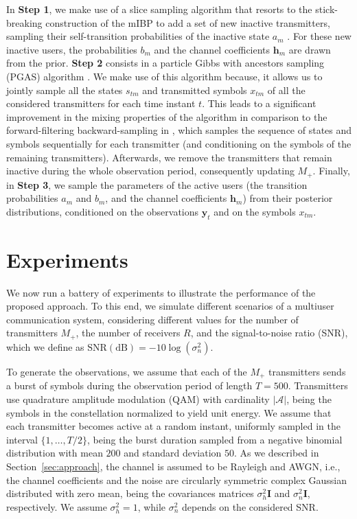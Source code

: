 \documentclass[a4paper]{article}
\def\yt{\mathbf{y}_t}
\def\hm{\mathbf{h}_m}
\def\xtm{x_{tm}}
\def\stm{s_{tm}}
\def\Acal{\mathcal{A}}
\begin{document}
In \textbf{Step 1}, we make use of a slice sampling  algorithm that resorts to the stick-breaking construction of the mIBP to add a set of new inactive transmitters, sampling their self-transition probabilities of the inactive state $a_m$ \cite{StickBreakingIBP}. For these new inactive users, the probabilities $b_m$  and the channel coefficients $\hm$ are drawn from the prior.
%
\textbf{Step 2} consists in a particle Gibbs with ancestors sampling (PGAS) algorithm \cite{lindsten2014particle}. We make use of this algorithm because, it allows us to jointly sample all the states $\stm$ and transmitted symbols $\xtm$ of all the considered transmitters for each time instant $t$. This leads to a significant improvement in the mixing properties of the algorithm in comparison to the forward-filtering backward-sampling in \cite{IFHMM}, which samples the sequence of states and symbols sequentially for each transmitter (and conditioning on the symbols of the remaining transmitters). Afterwards, we remove the transmitters that remain inactive during the whole observation period, consequently updating $M_+$. 
%
Finally, in \textbf{Step 3}, we sample the parameters of the active users (the transition probabilities $a_m$ and $b_m$, and the channel coefficients $\hm$) from their posterior distributions, conditioned on the observations $\yt$ and on the symbols $\xtm$.


\section{Experiments}
\label{sec:experiments}
We now run a battery of experiments to illustrate the performance of the proposed approach. To this end, we simulate different scenarios of a multiuser communication system, considering different values for the number of transmitters $M_+$, the number of receivers $R$, and the signal-to-noise ratio (SNR), which we define as $\mathrm{SNR (dB)} = -10 \log (\sigma^2_n)$. 

To generate the observations, we assume that each of the $M_+$ transmitters sends a burst of symbols during the observation period of length $T=500$. Transmitters use quadrature amplitude modulation (QAM) with cardinality $|\Acal|$, being the symbols in the constellation normalized to yield unit energy. We assume that each transmitter becomes active at a random instant, uniformly sampled in the interval $\{1, \ldots, T/2 \}$, being the burst duration sampled from a negative binomial distribution with mean $200$ and standard deviation $50$. As we described in Section~\ref{sec:approach}, the channel is assumed to be Rayleigh and AWGN, i.e., the channel coefficients and the noise are circularly symmetric complex Gaussian distributed with zero mean, being the covariances matrices $\sigma_h^2 \mathbf{I}$ and $\sigma_n^2 \mathbf{I}$, respectively. We assume $\sigma_h^2=1$, while $\sigma_n^2$ depends on the considered SNR.
\end{document}
